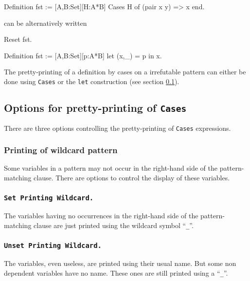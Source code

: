\begin{coq_example}
\begin{coq_example}
Definition fst := [A,B:Set][H:A*B] Cases H of (pair x y) => x end.
\end{coq_example}

can be alternatively written 

\begin{coq_eval}
Reset fst.
\end{coq_eval}
\begin{coq_example}
Definition fst := [A,B:Set][p:A*B] let (x,_) = p in x.
\end{coq_example}

The pretty-printing of a definition by cases on a irrefutable pattern
can either be done using {\tt Cases} or the {\tt let}
construction (see section \ref{printing-options}).

\subsection{Options for pretty-printing of {\tt Cases}}
\label{printing-options}

There are three options controlling the pretty-printing of {\tt Cases}
expressions.

\subsubsection{Printing of wildcard pattern}

Some variables in a pattern may not occur in the right-hand side of
the pattern-matching clause.  There are options to control the
display of these variables.

\subsubsection{\tt Set Printing Wildcard.}
 The variables having no occurrences
in the right-hand side of the pattern-matching clause are just
printed using the wildcard symbol ``{\tt \_}''.

\subsubsection{\tt Unset Printing Wildcard.}
The variables, even useless, are printed using their usual name. But some
non dependent variables have no name. These ones are still printed
using a ``{\tt \_}''.


\end{coq_example}

